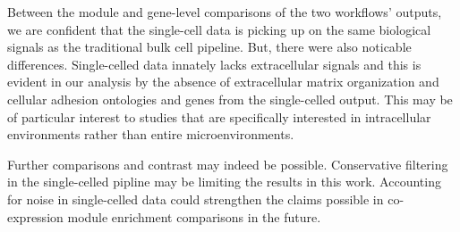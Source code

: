 \documentclass[10pt,letterpaper]{article}
\begin{document}
Between the module and gene-level comparisons of the two workflows' outputs, we are confident that the single-cell data is picking up on the same biological signals as the traditional bulk cell pipeline. But, there were also noticable differences. Single-celled data innately lacks extracellular signals and this is evident in our analysis by the absence of extracellular matrix organization and cellular adhesion ontologies and genes from the single-celled output. This may be of particular interest to studies that are specifically interested in intracellular environments rather than entire microenvironments.

Further comparisons and contrast may indeed be possible. Conservative filtering in the single-celled pipline may be limiting the results in this work. Accounting for noise in single-celled data could strengthen the claims possible in co-expression module enrichment comparisons in the future. 

\nolinenumbers


%
%
% 





\end{document}
